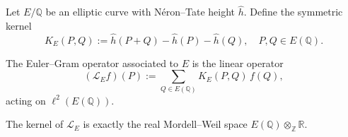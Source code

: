 \begin{definition}
Let $E/\mathbb{Q}$ be an elliptic curve with Néron--Tate height $\hat h$.
Define the symmetric kernel
\[
K_E(P,Q) := \hat h(P+Q) - \hat h(P) - \hat h(Q),
\quad P,Q \in E(\mathbb{Q}).
\]
\end{definition}

\begin{definition}
The Euler--Gram operator associated to $E$ is the linear operator
\[
(\mathcal L_E f)(P) := \sum_{Q \in E(\mathbb{Q})} K_E(P,Q)\, f(Q),
\]
acting on $\ell^2(E(\mathbb{Q}))$.
\end{definition}

\begin{remark}
The kernel of $\mathcal L_E$ is exactly the real Mordell--Weil space
$E(\mathbb{Q}) \otimes_{\mathbb{Z}} \mathbb{R}$.
\end{remark}

